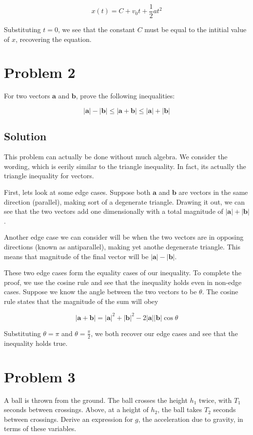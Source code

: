 \documentclass[11pt]{scrartcl}
\begin{document}
$$
x(t) = C + v_0 t + \frac{1}{2} at^2
$$

Substituting $t = 0$, we see that the constant $C$ must be equal to the intitial value of $x$, recovering the equation.

\newpage

\section{Problem 2}
For two vectors $\bm{a}$ and $\bm{b}$, prove the following inequalities:

$$
|\bm{a}| - |\bm{b}| \leq |\bm{a}+\bm{b}| \leq |\bm{a}|+ |\bm{b}|
$$

\subsection*{Solution}
This problem can actually be done without much algebra.
We consider the wording, which is eerily similar to the triangle inequality.
In fact, its actually the triangle inequality for vectors.

First, lets look at some edge cases.
Suppose both $\bm{a}$ and $\bm{b}$ are vectors in the same direction (parallel), making sort of a degenerate triangle.
Drawing it out, we can see that the two vectors add one dimensionally with a total magnitude of $|\bm{a}|+ |\bm{b}|$.

Another edge case we can consider will be when the two vectors are in opposing directions (known as antiparallel), making yet anothe degenerate triangle.
This means that magnitude of the final vector will be $|\bm{a}| - |\bm{b}|$.

These two edge cases form the equality cases of our inequality.
To complete the proof, we use the cosine rule and see that the inequality holds even in non-edge cases.
Suppose we know the angle between the two vectors to be $\theta$.
The cosine rule states that the magnitude of the sum will obey

$$
|\bm{a}+\bm{b}| = |\bm{a}|^2 + |\bm{b}|^2 - 2|\bm{a}||\bm{b}| \cos{\theta}
$$

Substituting $\theta = \pi$ and $\theta = \frac{\pi}{2}$, we both recover our edge cases and see that the inequality holds true. 

\newpage

\section{Problem 3}
A ball is thrown from the ground.
The ball crosses the height $h_1$ twice, with $T_1$ seconds between crossings.
Above, at a height of $h_2$, the ball takes $T_2$ seconds between crossings.
Derive an expression for $g$, the acceleration due to gravity, in terms of these variables.
\end{document}
